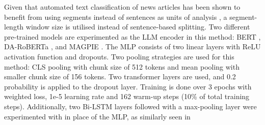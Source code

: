 Given that automated text classification of news articles has been shown to benefit from using segments instead of sentences as units of analysis \cite{barbera-2021-article-classification}, a segment-length window size is utilised instead of sentence-based splitting. Two different pre-trained models are experimented as the LLM encoder in this method: BERT \cite{devlin-2019-bert}, DA-RoBERTa \cite{krieger-2022-domain}, and MAGPIE \cite{horych-2024-magpie}. The MLP consists of two linear layers with ReLU activation function \cite{agarap-2018-relu} and dropouts. Two pooling strategies are used for this method: CLS pooling with chunk size of 512 tokens and mean pooling with smaller chunk size of 156 tokens. Two transformer layers are used, and 0.2 probability is applied to the dropout layer. Training is done over 3 epochs with weighted loss, 1e-5 learning rate and 162 warm-up steps (10\% of total training steps). Additionally, two Bi-LSTM layers followed with a max-pooling layer were experimented with in place of the MLP, as similarly seen in \cite{khandve-2022-hierarchical-longdoc}










